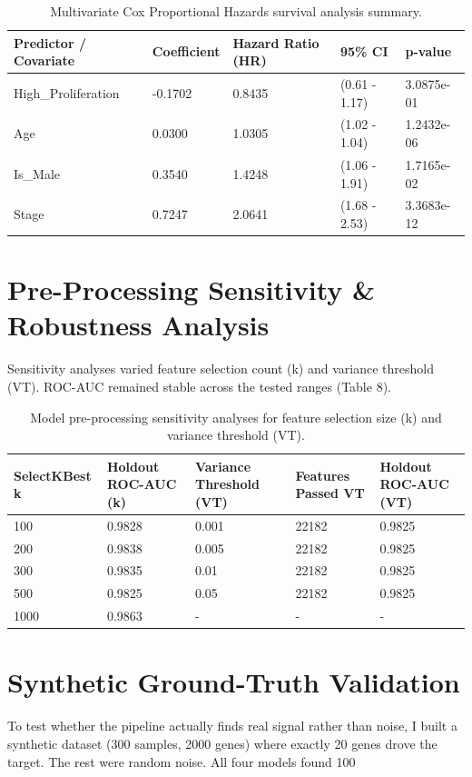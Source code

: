 \documentclass[11pt]{article}
\begin{document}
\begin{table}[H]
\centering
\caption{Multivariate Cox Proportional Hazards survival analysis summary.}
\begin{tabular}{lllll}
\toprule
\textbf{Predictor / Covariate} & \textbf{Coefficient} & \textbf{Hazard Ratio (HR)} & \textbf{95\% CI} & \textbf{p-value} \\
\midrule
  High\_Proliferation & -0.1702 & 0.8435 & (0.61 - 1.17) & 3.0875e-01 \\
  Age & 0.0300 & 1.0305 & (1.02 - 1.04) & 1.2432e-06 \\
  Is\_Male & 0.3540 & 1.4248 & (1.06 - 1.91) & 1.7165e-02 \\
  Stage & 0.7247 & 2.0641 & (1.68 - 2.53) & 3.3683e-12 \\
\bottomrule
\end{tabular}
\end{table}

\section{Pre-Processing Sensitivity \& Robustness Analysis}
Sensitivity analyses varied feature selection count (k) and variance threshold (VT). ROC-AUC remained stable across the tested ranges (Table 8).

\begin{table}[H]
\centering
\caption{Model pre-processing sensitivity analyses for feature selection size (k) and variance threshold (VT).}
\begin{tabular}{lllll}
\toprule
\textbf{SelectKBest k} & \textbf{Holdout ROC-AUC (k)} & \textbf{Variance Threshold (VT)} & \textbf{Features Passed VT} & \textbf{Holdout ROC-AUC (VT)} \\
\midrule
  100 & 0.9828 & 0.001 & 22182 & 0.9825 \\
  200 & 0.9838 & 0.005 & 22182 & 0.9825 \\
  300 & 0.9835 & 0.01 & 22182 & 0.9825 \\
  500 & 0.9825 & 0.05 & 22182 & 0.9825 \\
  1000 & 0.9863 & - & - & - \\
\bottomrule
\end{tabular}
\end{table}

\section{Synthetic Ground-Truth Validation}
To test whether the pipeline actually finds real signal rather than noise, I built a synthetic dataset (300 samples, 2000 genes) where exactly 20 genes drove the target. The rest were random noise. All four models found 100%
\end{document}
